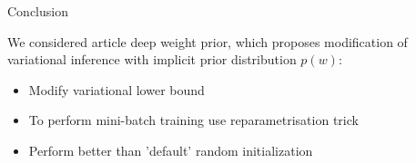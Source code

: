 \documentclass[19pt]{beamer}
\begin{document}
\begin{frame}{Conclusion}

We considered article deep weight prior, which proposes modification of variational inference with implicit prior distribution $p(w)$:\\
\begin{itemize}
    \item Modify variational lower bound
    \item To perform mini-batch training use reparametrisation trick
    \item Perform better than 'default' random initialization
\end{itemize}

\end{frame}
\end{document}
